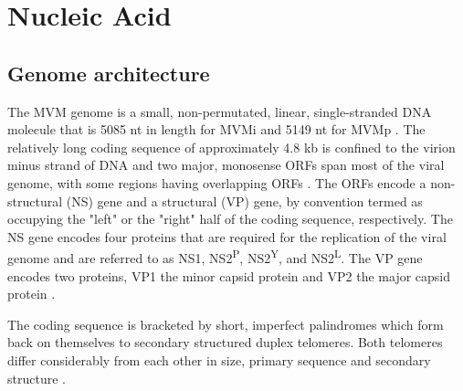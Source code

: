 \section{Nucleic Acid}

\subsection{Genome architecture}
The MVM genome is a small, non-permutated, linear, single-stranded DNA molecule \cite{Genome1, Genome2} that is 5085 nt in length for MVMi \cite{pmid3855242} and 5149 nt for MVMp \cite{pmid6298737}. The relatively long coding sequence of approximately 4.8 kb is confined to the virion minus strand of DNA \cite{pmid6828378, pmid3296697} and two major, monosense ORFs span most of the viral genome, with some regions having overlapping ORFs \cite{pmid6298737}. The ORFs encode a non-structural (NS) gene and a structural (VP) gene, by convention termed as occupying the "left" or the "right" half of the coding sequence, respectively. The NS gene encodes four proteins that are required for the replication of the viral genome and are referred to as NS1, NS2\textsuperscript{P}, NS2\textsuperscript{Y}, and NS2\textsuperscript{L}. The VP gene encodes two proteins, VP1 the minor capsid protein and VP2 the major capsid protein \cite{pmid6828378, pmid2939261, pmid2942705}.           

The coding sequence is bracketed by short, imperfect palindromes which form back on themselves to secondary structured duplex telomeres. Both telomeres differ considerably from each other in size, primary sequence and secondary structure \cite{pmid6298737}. 

